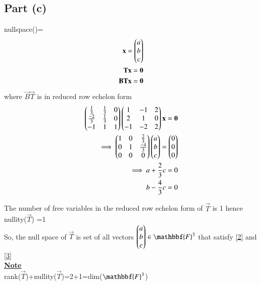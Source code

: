 \documentclass[journal,12pt,twocolumn]{IEEEtran}
\begin{document}
\subsection{Part (c)}
nullspace()=
\begin{align}
\mathbf{x}=\begin{pmatrix}a\\b\\c\end{pmatrix}\\
    \mathbf{T}\mathbf{x}=\mathbf{0}\\
    \mathbf{B}\mathbf{T}\mathbf{x}=\mathbf{0}
    \end{align}
    where $ \vec{B}\vec{T}$ is in reduced row echelon form
    \begin{align}
     \begin{pmatrix}\frac{1}{3}&\frac{1}{3}&0\\\frac{-2}{3}&\frac{1}{3}&0\\-1&1&1\end{pmatrix}\begin{pmatrix}1&-1&2\\2&1&0\\-1&-2&2\end{pmatrix}\mathbf{x}=\mathbf{0}\\
     \implies  \begin{pmatrix}1&0&\frac{2}{3}\\0&1&\frac{-4}{3}\\0&0&0\end{pmatrix}\begin{pmatrix}a\\b\\c\end{pmatrix}=\begin{pmatrix}0\\0\\0\end{pmatrix}
    \\\implies a+\frac{2}{3}c=0\label{2}\\b-\frac{4}{3}c=0\label{3}
    \end{align}
    
The number of free variables in the reduced row echelon form of $\vec{T}$ is 1 hence nullity($\vec{T}$) =1\\
So, the null space of $\vec{T}$ is set of all vectors $\myvec{a\\b\\c} \in \mathbbf{F}^3$ that satisfy \eqref{2} and \eqref{3}\\
\underline{\textbf{Note}}\\
rank($\vec{T}$)+nullity($\vec{T}$)=2+1=dim($ \mathbbf{F}^3$)
\end{document}
